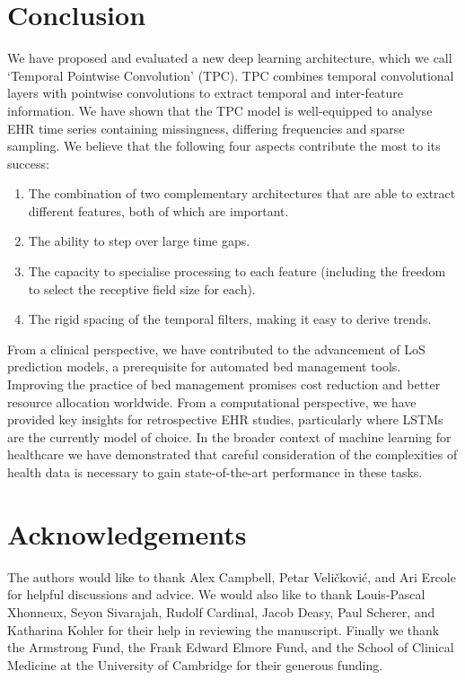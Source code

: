 \documentclass[sigconf]{acmart}
\begin{document}
\section{Conclusion}
We have proposed and evaluated a new deep learning architecture, which we call `Temporal Pointwise Convolution' (TPC). TPC combines temporal convolutional layers with pointwise convolutions to extract temporal and inter-feature information. We have shown that the TPC model is well-equipped to analyse EHR time series containing missingness, differing frequencies and sparse sampling. We believe that the following four aspects contribute the most to its success:
\begin{enumerate}
    \item The combination of two complementary architectures that are able to extract different features, both of which are important.
    \item The ability to step over large time gaps.
    \item The capacity to specialise processing to each feature (including the freedom to select the receptive field size for each).
    \item The rigid spacing of the temporal filters, making it easy to derive trends.
\end{enumerate}
From a clinical perspective, we have contributed to the advancement of LoS prediction models, a prerequisite for automated bed management tools. Improving the practice of bed management promises cost reduction \citep{Halpern2015} and better resource allocation \citep{Mathews2015} worldwide. From a computational perspective, we have provided key insights for retrospective EHR studies, particularly where LSTMs are the currently model of choice. In the broader context of machine learning for healthcare we have demonstrated that careful consideration of the complexities of health data is necessary to gain state-of-the-art performance in these tasks.

\section*{Acknowledgements}
The authors would like to thank Alex Campbell, Petar Veli\v{c}kovi\'{c}, and Ari Ercole for helpful discussions and advice. We would also like to thank Louis-Pascal Xhonneux, Seyon Sivarajah, Rudolf Cardinal, Jacob Deasy, Paul Scherer, and Katharina Kohler for their help in reviewing the manuscript. Finally we thank the Armstrong Fund, the Frank Edward Elmore Fund, and the School of Clinical Medicine at the University of Cambridge for their generous funding. 


\end{document}

